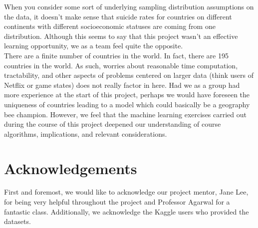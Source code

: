 \documentclass{article}
\begin{document}
\begin{multicols}{2}
When you consider some sort of underlying sampling distribution assumptions on the data, it doesn't make sense that suicide rates for countries on different continents with different socioeconomic statuses are coming from one distribution. Although this seems to say that this project wasn't an effective learning opportunity, we as a team feel quite the opposite. \\
There are a finite number of countries in the world. In fact, there are 195 countries in the world. As such, worries about reasonable time computation, tractability, and other aspects of problems centered on larger data (think users of Netflix or game states) does not really factor in here. Had we as a group had more experience at the start of this project, perhaps we would have foreseen the uniqueness of countries leading to a model which could basically be a geography bee champion. However, we feel that the machine learning exercises carried out during the course of this project deepened our understanding of course algorithms, implications, and relevant considerations.








\section{Acknowledgements} First and foremost, we would like to acknowledge our project mentor, Jane Lee, for being very helpful throughout the project and Professor Agarwal for a fantastic class. Additionally, we acknowledge the Kaggle users who provided the datasets.

\end{multicols}
\end{document}
